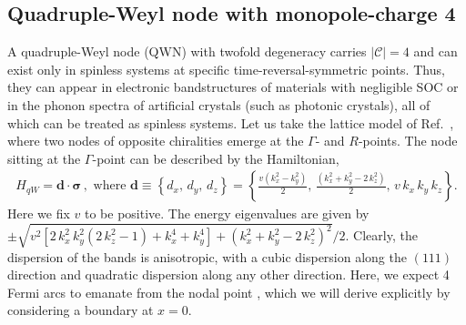 \documentclass[aps,prb,onecolumn, footinbib, 10pt]{revtex4-2}
\begin{document}
\subsection{Quadruple-Weyl node with monopole-charge 4}


 
A quadruple-Weyl node (QWN) with twofold degeneracy carries $|\mathcal C| = 4 $ \cite{charge4-1, charge4-2, charge4-3, charge4-4} and can exist only in spinless systems at specific time-reversal-symmetric points. Thus, they can appear in electronic bandstructures of materials with
negligible SOC or in the phonon spectra of artificial crystals (such as photonic crystals), all of which can be treated as spinless systems. Let us take the lattice model of Ref.~\cite{charge4-4}, where two nodes of opposite chiralities emerge at the $\Gamma$- and $R$-points. The node sitting at the $\Gamma$-point can be described by the Hamiltonian,
\begin{align}
\label{eqhamqw}
H_{qW} = \boldsymbol{d} \cdot \boldsymbol{\sigma}  \,, \text{ where }
\boldsymbol{d} \equiv \left\{ d_x,\, d_y, \, d_z \right\}= \left\{\frac{ v \left(k_x^2-k_y^2\right)}{2}, \,\frac{\left(k_x^2+k_y^2-2 \,k_z^2\right)}{2} ,
\,v\, k_x\, k_y\, k_z\right\} .
\end{align}
Here we fix $v$ to be positive. The energy eigenvalues are given by $\pm \sqrt{ v^2 \left [
2 \,k_x^2 \,k_y^2 \left(2 \,k_z^2-1\right)+k_x^4+k_y^4\right ]
+\left(k_x^2+k_y^2-2\, k_z^2\right)^2 } / 2$. Clearly, the dispersion of the bands is anisotropic, with a cubic dispersion along the $(111)$ direction and quadratic dispersion along any other direction. Here, we expect 4 Fermi arcs to emanate from the nodal point \cite{quad-weyl-arc}, which we will derive explicitly by considering a boundary at $x = 0$.
\end{document}
